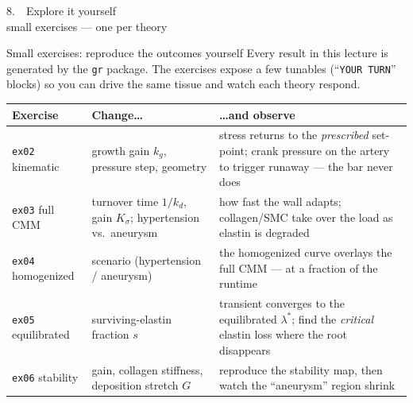 \begin{frame}[t]{}
  \vfill\begin{center}{\Huge\color{YaleBlue} 8.\ \ Explore it yourself}\\[0.5em]
  {\color{BoxGray} small exercises --- one per theory}\end{center}\vfill
\end{frame}

\begin{frame}[t]{Small exercises: reproduce the outcomes yourself}
  Every result in this lecture is generated by the \texttt{gr} package. The
  exercises expose a few tunables (``\texttt{YOUR TURN}'' blocks) so you can drive
  the same tissue and watch each theory respond.
  \vspace{0.3em}
  \small
  \begin{center}
  \renewcommand{\arraystretch}{1.35}
  \begin{tabular}{@{}p{}p{}p{}@{}}
    \toprule
    \textbf{Exercise} & \textbf{Change\ldots} & \textbf{\ldots and observe} \\
    \midrule
    \texttt{ex02} kinematic & growth gain $k_g$, pressure step, geometry &
      stress returns to the \emph{prescribed} set-point; crank pressure on the
      artery to trigger runaway --- the bar never does \\
    \texttt{ex03} full CMM & turnover time $1/k_d$, gain $K_\sigma$; hypertension
      vs.\ aneurysm & how fast the wall adapts; collagen/SMC take over the load as
      elastin is degraded \\
    \texttt{ex04} homogenized & scenario (hypertension / aneurysm) &
      the homogenized curve overlays the full CMM --- at a fraction of the runtime \\
    \texttt{ex05} equilibrated & surviving-elastin fraction $s$ &
      transient converges to the equilibrated $\lambda^*$; find the \emph{critical}
      elastin loss where the root disappears \\
    \texttt{ex06} stability & gain, collagen stiffness, deposition stretch $G$ &
      reproduce the stability map, then watch the ``aneurysm'' region shrink \\
    \bottomrule
  \end{tabular}
  \end{center}
\end{frame}

